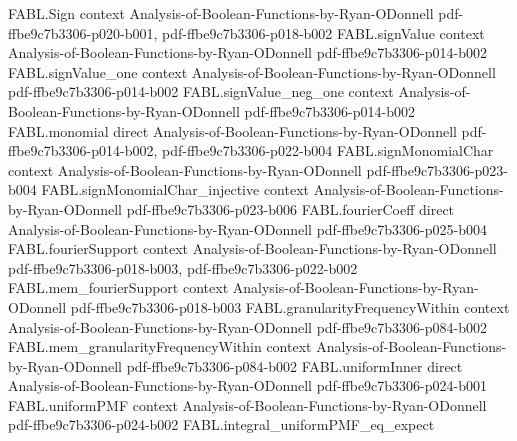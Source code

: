 \begin{theorem}
\label{FABL.FiniteFourierBasis.sum_fourierComponentAtSupport}
\leanok
{}
\proofstep
  {FABL.Sign}
  {context}
  {Analysis-of-Boolean-Functions-by-Ryan-ODonnell}
  {pdf-ffbe9c7b3306-p020-b001,
    pdf-ffbe9c7b3306-p018-b002}
\proofstep
  {FABL.signValue}
  {context}
  {Analysis-of-Boolean-Functions-by-Ryan-ODonnell}
  {pdf-ffbe9c7b3306-p014-b002}
\proofstep
  {FABL.signValue_one}
  {context}
  {Analysis-of-Boolean-Functions-by-Ryan-ODonnell}
  {pdf-ffbe9c7b3306-p014-b002}
\proofstep
  {FABL.signValue_neg_one}
  {context}
  {Analysis-of-Boolean-Functions-by-Ryan-ODonnell}
  {pdf-ffbe9c7b3306-p014-b002}
\proofstep
  {FABL.monomial}
  {direct}
  {Analysis-of-Boolean-Functions-by-Ryan-ODonnell}
  {pdf-ffbe9c7b3306-p014-b002,
    pdf-ffbe9c7b3306-p022-b004}
\proofstep
  {FABL.signMonomialChar}
  {context}
  {Analysis-of-Boolean-Functions-by-Ryan-ODonnell}
  {pdf-ffbe9c7b3306-p023-b004}
\proofstep
  {FABL.signMonomialChar_injective}
  {context}
  {Analysis-of-Boolean-Functions-by-Ryan-ODonnell}
  {pdf-ffbe9c7b3306-p023-b006}
\proofstep
  {FABL.fourierCoeff}
  {direct}
  {Analysis-of-Boolean-Functions-by-Ryan-ODonnell}
  {pdf-ffbe9c7b3306-p025-b004}
\proofstep
  {FABL.fourierSupport}
  {context}
  {Analysis-of-Boolean-Functions-by-Ryan-ODonnell}
  {pdf-ffbe9c7b3306-p018-b003,
    pdf-ffbe9c7b3306-p022-b002}
\proofstep
  {FABL.mem_fourierSupport}
  {context}
  {Analysis-of-Boolean-Functions-by-Ryan-ODonnell}
  {pdf-ffbe9c7b3306-p018-b003}
\proofstep
  {FABL.granularityFrequencyWithin}
  {context}
  {Analysis-of-Boolean-Functions-by-Ryan-ODonnell}
  {pdf-ffbe9c7b3306-p084-b002}
\proofstep
  {FABL.mem_granularityFrequencyWithin}
  {context}
  {Analysis-of-Boolean-Functions-by-Ryan-ODonnell}
  {pdf-ffbe9c7b3306-p084-b002}
\proofstep
  {FABL.uniformInner}
  {direct}
  {Analysis-of-Boolean-Functions-by-Ryan-ODonnell}
  {pdf-ffbe9c7b3306-p024-b001}
\proofstep
  {FABL.uniformPMF}
  {context}
  {Analysis-of-Boolean-Functions-by-Ryan-ODonnell}
  {pdf-ffbe9c7b3306-p024-b002}
\proofstep
  {FABL.integral_uniformPMF_eq_expect}

\end{theorem}
